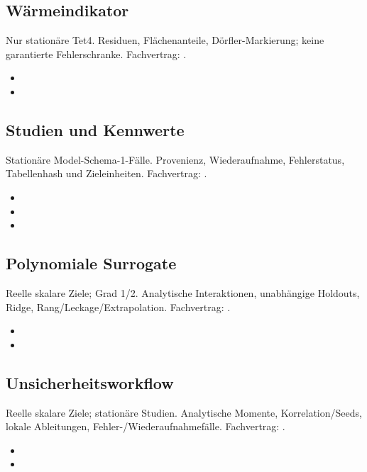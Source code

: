 \subsection{Wärmeindikator}
\label{sec:vv-indicator}
Nur stationäre Tet4. Residuen, Flächenanteile, Dörfler-Markierung; keine garantierte Fehlerschranke.
Fachvertrag: .
\begin{itemize}
\item {}
\item {}
\end{itemize}
\subsection{Studien und Kennwerte}
\label{sec:vv-studies}
Stationäre Model-Schema-1-Fälle. Provenienz, Wiederaufnahme, Fehlerstatus, Tabellenhash und Zieleinheiten.
Fachvertrag: .
\begin{itemize}
\item {}
\item {}
\item {}
\end{itemize}
\subsection{Polynomiale Surrogate}
\label{sec:vv-surrogates}
Reelle skalare Ziele; Grad 1/2. Analytische Interaktionen, unabhängige Holdouts, Ridge, Rang/Leckage/Extrapolation.
Fachvertrag: .
\begin{itemize}
\item {}
\item {}
\end{itemize}
\subsection{Unsicherheitsworkflow}
\label{sec:vv-uncertainty}
Reelle skalare Ziele; stationäre Studien. Analytische Momente, Korrelation/Seeds, lokale Ableitungen, Fehler-/Wiederaufnahmefälle.
Fachvertrag: .
\begin{itemize}
\item {}
\item {}
\end{itemize}
